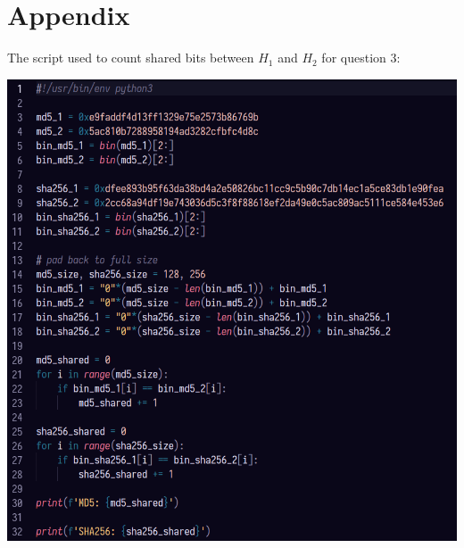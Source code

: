 \documentclass[12pt,largemargins]{homework}
\begin{document}
\section*{Appendix}
The script used to count shared bits between $H_1$ and $H_2$ for question 3:
\begin{center}
    \includegraphics[width=.75\textwidth]{count-shared-bits-py.png}
\end{center}
\end{document}
